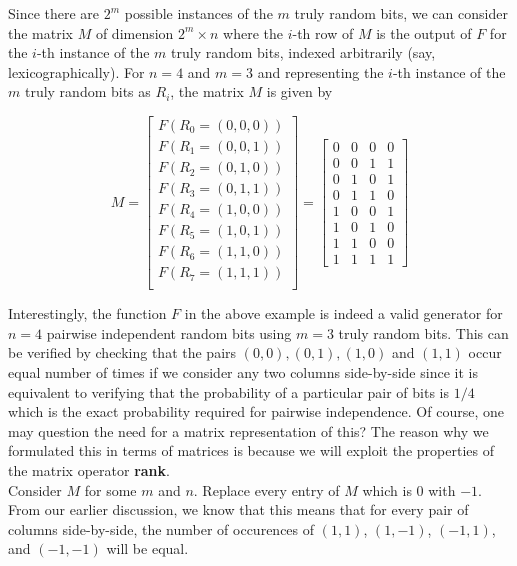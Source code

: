 Since there are $2^m$ possible instances of the $m$ truly random bits, we can consider the matrix $M$ of 
dimension $2^m \times n$ where the $i$-th row of $M$ is the output of $F$ for the $i$-th instance 
of the $m$ truly random bits, indexed arbitrarily (say, lexicographically). For $n=4$ and $m=3$ and 
representing the $i$-th instance of the $m$ truly random bits as $R_i$, the matrix $M$ is given by

\[
M=
\begin{bmatrix}
F(R_0=(0,0,0))\\
F(R_1=(0,0,1))\\
F(R_2=(0,1,0))\\
F(R_3=(0,1,1))\\
F(R_4=(1,0,0))\\
F(R_5=(1,0,1))\\
F(R_6=(1,1,0))\\
F(R_7=(1,1,1))\\
\end{bmatrix}
=
\begin{bmatrix}
0&0&0&0\\
0&0&1&1\\
0&1&0&1\\
0&1&1&0\\
1&0&0&1\\
1&0&1&0\\
1&1&0&0\\
1&1&1&1
\end{bmatrix}
\]

\noindent Interestingly, the function $F$ in the above example is indeed a valid generator for $n=4$ pairwise independent 
random bits using $m=3$ truly random bits. This can be verified by checking that the pairs 
$(0,0),(0,1),(1,0)$ and $(1,1)$ occur equal number of times if we consider any two columns side-by-side since 
it is equivalent to verifying that the probability of a particular pair of bits is $1/4$ which is the exact 
probability required for pairwise independence. Of course, one may question the need for a matrix 
representation of this? The reason why we formulated this in terms of matrices is because we 
will exploit the properties of the matrix operator \textbf{rank}.\\

Consider $M$ for some $m$ and $n$. Replace every entry of $M$ which is $0$ with $-1$. From our earlier discussion, 
we know that this means that for every pair of columns side-by-side, the number of occurences of $(1,1)$, 
$(1,-1)$, $(-1,1)$, and $(-1,-1)$ will be equal. 

